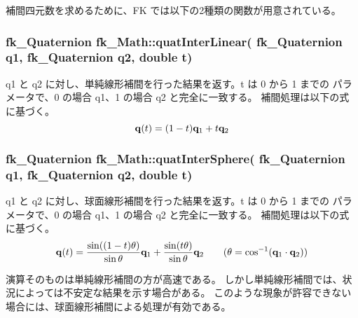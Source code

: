 補間四元数を求めるために、FK では以下の2種類の関数が用意されている。

\subsubsection*{fk\_Quaternion \quad fk\_Math::quatInterLinear(
fk\_Quaternion q1, fk\_Quaternion q2, double t)}
q1 と q2 に対し、単純線形補間を行った結果を返す。t は 0 から 1 までの
パラメータで、0 の場合 q1、1 の場合 q2 と完全に一致する。
補間処理は以下の式に基づく。
\[
	\mathbf{q}(t) = (1 - t)\mathbf{q}_1 + t\mathbf{q}_2
\]

\subsubsection*{fk\_Quaternion \quad fk\_Math::quatInterSphere(
fk\_Quaternion q1, fk\_Quaternion q2, double t)}
q1 と q2 に対し、球面線形補間を行った結果を返す。t は 0 から 1 までの
パラメータで、0 の場合 q1、1 の場合 q2 と完全に一致する。
補間処理は以下の式に基づく。
\[
	\mathbf{q}(t) = \frac{\sin((1-t)\theta)}{\sin\theta}\mathbf{q}_1 +
	       \frac{\sin(t\theta)}{\sin\theta}\mathbf{q}_2
	       \qquad (\theta = \cos^{-1}(\mathbf{q}_1\cdot\mathbf{q}_2))
\]

演算そのものは単純線形補間の方が高速である。
しかし単純線形補間では、状況によっては不安定な結果を示す場合がある。
このような現象が許容できない場合には、球面線形補間による処理が有効である。
